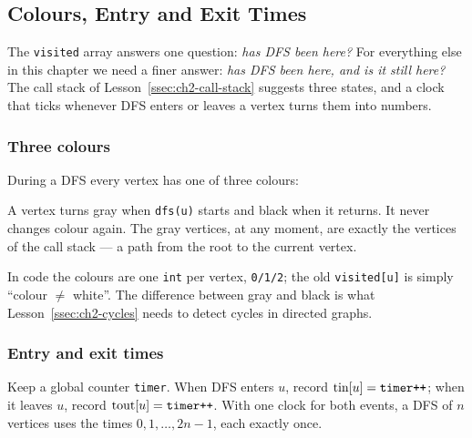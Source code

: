 \subsection{Colours, Entry and Exit Times}
\label{ssec:ch2-timestamps}

The \texttt{visited} array answers one question: \emph{has DFS been here?} For everything else in this chapter we need a finer answer: \emph{has DFS been here, and is it still here?} The call stack of Lesson~\ref{ssec:ch2-call-stack} suggests three states, and a clock that ticks whenever DFS enters or leaves a vertex turns them into numbers.

\subsubsection*{Three colours}

\begin{definitionbox}
During a DFS every vertex has one of three colours:
\begin{center}
 \qquad {} \qquad {}
\end{center}
A vertex turns gray when \texttt{dfs(u)} starts and black when it returns. It never changes colour again. The gray vertices, at any moment, are exactly the vertices of the call stack --- a path from the root to the current vertex.
\end{definitionbox}

In code the colours are one \texttt{int} per vertex, \texttt{0/1/2}; the old \texttt{visited[u]} is simply ``colour $\ne$ white''. The difference between gray and black is what Lesson~\ref{ssec:ch2-cycles} needs to detect cycles in directed graphs.

\subsubsection*{Entry and exit times}

Keep a global counter \texttt{timer}. When DFS enters $u$, record $\mathrm{tin}[u] = \texttt{timer++}$; when it leaves $u$, record $\mathrm{tout}[u] = \texttt{timer++}$. With one clock for both events, a DFS of $n$ vertices uses the times $0, 1, \dots, 2n-1$, each exactly once.


